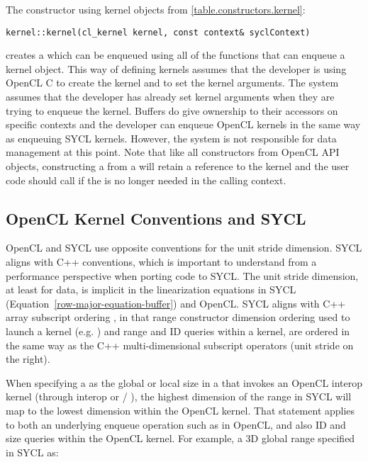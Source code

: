 The constructor using kernel objects from \ref{table.constructors.kernel}:
\begin{lstlisting}[style=nonumbers]
kernel::kernel(cl_kernel kernel, const context& syclContext)
\end{lstlisting}

creates a  which can be enqueued using
all of the  functions that can enqueue a kernel object.
This way of defining kernels assumes that
the developer is using OpenCL C to create the kernel and to set the
kernel arguments. The system assumes that the developer has already
set kernel arguments when they are trying to enqueue the
kernel. Buffers do give ownership to their accessors on specific
contexts and the developer can enqueue OpenCL kernels in the same way
as enqueuing SYCL kernels.  However, the system is not responsible for
data management at this point.  Note that like all constructors from
OpenCL API objects, constructing a  from
a  will retain a reference to the kernel and the
user code should call  if the
 is no longer needed in the calling context.


\subsection{OpenCL Kernel Conventions and SYCL}
\label{subsec:opencl-kern-conventions-and-sycl}

OpenCL and SYCL use opposite conventions for the unit stride dimension.  SYCL
aligns with C++ conventions, which is important to understand from a performance
perspective when porting code to SYCL.  The unit stride dimension, at least for data, is implicit in the
linearization equations in SYCL (Equation~\ref{row-major-equation-buffer}) and OpenCL.  SYCL aligns with C++ array subscript ordering
, in that range constructor dimension ordering used to launch a kernel
(e.g. ) and range and ID queries within a kernel, are ordered in
the same way as the C++ multi-dimensional subscript operators (unit stride on the right).

When specifying a  as the global or local size
in a  that invokes an OpenCL interop kernel (through
 interop or /
),
the highest dimension of the range in SYCL will map to the
lowest dimension within the OpenCL kernel.  That statement applies to both
an underlying enqueue operation such as 
in OpenCL, and also ID and size queries within the OpenCL kernel.
For example, a 3D global range specified in SYCL as:

